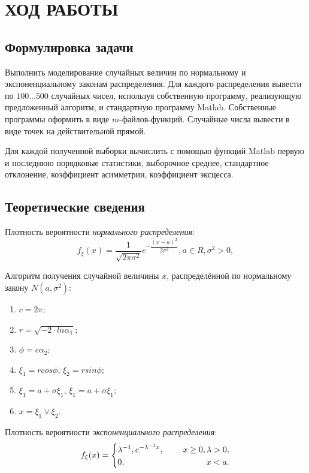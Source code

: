 \section{ХОД РАБОТЫ}

\subsection{Формулировка задачи}

Выполнить моделирование случайных величин по нормальному и экспоненциальному законам распределения.
Для каждого распределения вывести по $100 \dots 500$ случайных чисел, используя собственную программу,
реализующую предложенный алгоритм, и стандартную программу Matlab.
Собственные программы оформить в виде $m$-файлов-функций.
Случайные числа вывести в виде точек на действительной прямой.

Для каждой полученной выборки вычислить с помощью функций Matlab первую и последнюю
порядковые статистики, выборочное среднее, стандартное отклонение,
коэффициент асимметрии, коэффициент эксцесса.

\subsection{Теоретические сведения}
\label{sub:theory}

Плотность вероятности \textit{нормального распределения}:
\begin{equation}
    f_{\xi}(x) =
    \dfrac{1}{\sqrt{2 \pi \sigma^2}} e^{- \dfrac{(x-a)^2}{2 \sigma^2}}, a \in R, \sigma^2 > 0,
\end{equation}

Алгоритм получения случайной величины $ x $, распределённой по нормальному
закону $ N (a, \sigma^2) $:

\begin{enumerate}
  \item $ c = 2 \pi $;
  \item $ r = \sqrt{-2 \cdot ln \alpha_1} $;
  \item $ \phi = c \alpha_2 $;
  \item $ \xi_1 = r cos\phi $, $ \xi_2 = r sin\phi $;
  \item $ \xi_1 = a + \sigma \xi_1 $, $ \xi_1 = a + \sigma \xi_1 $;
  \item $ x = \xi_1 \vee  \xi_2 $.
\end{enumerate}

\newpage

Плотность вероятности \textit{экспоненциального распределения}:
\begin{equation}
  \begin{aligned}
    f_{\xi}(x) =
    \left\{
      \begin{aligned}
        &\lambda^{-1}, e^{-\lambda^{-1}x}, \hspace{5mm} &x \ge 0, \lambda > 0, \\
        &0, \hspace{11.5mm} &x < a.
      \end{aligned}
    \right.
  \end{aligned}
\end{equation}

